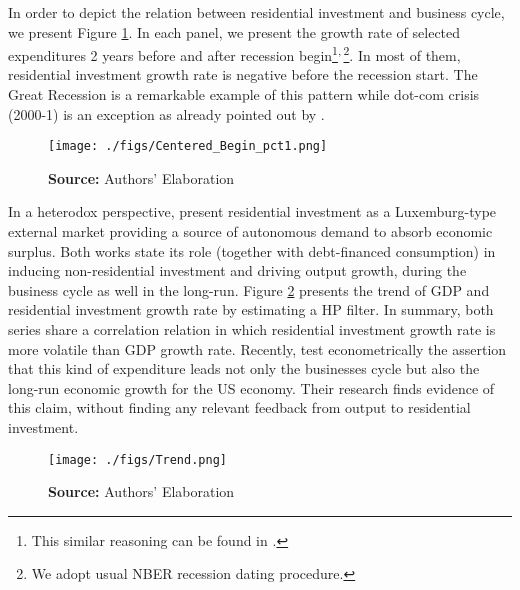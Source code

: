\documentclass[12pt, a4paper]{article}
\begin{document}
In order to depict the relation between residential investment and business cycle, we present Figure \ref{fig:cycle}.
In each panel, we present the growth rate of selected expenditures 2 years before and after recession begin\footnote{This similar reasoning can be found in \textcite{leamer_housing_2007}.}\textsuperscript{,}\,\footnote{We adopt usual NBER recession dating procedure.}.
In most of them, residential investment growth rate is negative before the recession start.
The Great Recession is a remarkable example of this pattern while dot-com crisis (2000-1) is an exception as already pointed out by \textcite{leamer_housing_2007}.


\begin{figure}[H]
	\centering
	\caption{Selected expecditure growth rates 2 years before and after recession start}
	\label{fig:cycle}
	\texttt{[image: ./figs/Centered\_Begin\_pct1.png]}
	\caption*{\textbf{Source:} Authors' Elaboration}
\end{figure}

In a heterodox perspective, \textcites{fiebiger_semi-autonomous_2018}{fiebiger_trend_2017} present residential investment as a Luxemburg-type external market providing a source of autonomous demand to absorb economic surplus.
Both works state its role (together with debt-financed consumption) in inducing non-residential investment and driving output growth, during the business cycle as well in the long-run.
Figure \ref{fig:trend} presents the trend of GDP and residential investment growth rate by estimating a HP filter.
In summary, both series share a correlation relation in which residential investment growth rate is more volatile than GDP growth rate.
Recently, \textcite{perez_Montiel_2021} test econometrically the assertion that this kind of expenditure leads not only the businesses cycle but also the long-run economic growth for the US economy. Their research finds evidence of this claim, without finding any relevant feedback from output to residential investment.

\begin{figure}[H]
	\centering
	\caption{GDP and Residential investment growth rate tred (HP filter, $\lambda = 1600$)}
	\label{fig:trend}
	\texttt{[image: ./figs/Trend.png]}
	\caption*{\textbf{Source:} Authors' Elaboration}
\end{figure}
\end{document}
